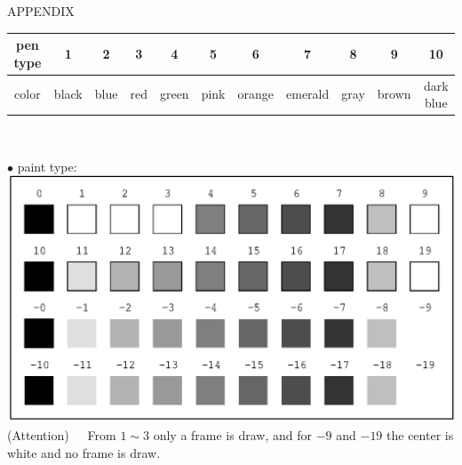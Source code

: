\begin{qsection}{APPENDIX}
\begin{center}
\begin{tabular}{|c|c|c|c|c|c|c|c|c|c|c|}
 \hline
 pen type& 1& 2& 3& 4& 5& 6& 7& 8& 9&10  \\ \hline
 color   & black& blue& red& green& pink& orange& emerald& gray&brown & 
 dark blue \\ \hline
\end{tabular}\\
\end{center}

\vspace{5mm}
{\large \hspace{-1.5ex}$\bullet$ paint type:}\\
\includegraphics{fig/paint.eps}\\
(Attention)~~~From $1 \sim 3$ only a frame is draw,
and for $-9$ and $-19$ the center is white and no frame is draw.

\end{qsection}
